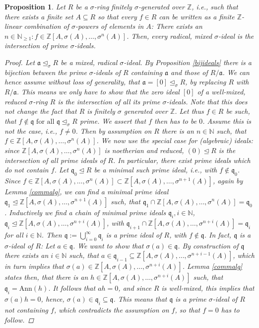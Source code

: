 \documentclass{article}
\def\NE{\mathbb{N}_{\geq1}}
\def\N{\mathbb{N}}
\def\Z{\mathbb{Z}}
\def\a{\mathfrak{a}}
\def\q{\mathfrak{q}}
\def\s{\sigma}
\def\si{\unlhd_{\sigma}}
\def\fa{\text{ for all }}
\newenvironment{bew}{\begin{proof}[Proof]}{\end{proof}}
\theoremstyle{plain}
\newtheorem{prop}[Satz]{Proposition}
\theoremstyle{definition}
\begin{document}
\begin{prop}\label{mixedintersectionprimesfinite}
Let $R$ be a $\s$-ring finitely $\s$-generated over $\Z$, i.e., such that there exists a finite set $A \subseteq R$ so that every $f \in R$ can be written as a finite $\Z$-linear combination of $\s$-powers of elements in $A$: 
There exists an $n \in \NE: f \in \Z[A,\sigma(A),\ldots,\s^n(A)]$. Then, every radical, mixed $\s$-ideal is the intersection of prime $\s$-ideals.
\begin{bew}
Let $\a \si R$ be a mixed, radical $\s$-ideal. By Proposition \ref{bijideals} there is a bijection between the prime $\s$-ideals of $R$ containing $\a$ and those of $R/\a$. We can hence assume without loss of generality, that $\a = [0] \si R$,
 by replacing $R$ with $R/\a$. This means we only have to show that the zero ideal $[0]$ of a well-mixed, reduced $\s$-ring $R$ is the intersection of all its prime $\s$-ideals. Note that this does not change the fact
that $R$ is finitely $\s$ generated over $\Z$. Let thus $f \in R$ be such, 
that $f \notin \q \fa \q \si R$ prime. We assert that $f$ then has to be $0$. Assume this is not the case, i.e., $f \neq 0$. Then by assumption on $R$ there is an $n \in \N$ such, that $f \in \Z[A,\s(A),\ldots,\s^n(A)]$.
We now use the special case for (algebraic) ideals: since $\Z[A,\s(A),\ldots,\s^n(A)]$ is noetherian and reduced, $(0) \unlhd R$ is the intersection of all prime ideals of $R$. In particular, there exist prime ideals which do not contain $f$.
Let $\q_0 \unlhd R$ be a minimal such prime ideal, i.e., with $f \notin \q_0$. Since $f \in \Z[A,\s(A),\ldots,\s^n(A)] \subset \Z[A,\s(A),\ldots,\s^{n+1}(A)]$, again by Lemma \ref{commalg}, we can find a minimal prime ideal $\q_1 \unlhd \Z[A,\s(A),\ldots,\s^{n+1}(A)]$
such, that $\q_1 \cap \Z[A,\s(A),\ldots,\s^{n}(A)] = \q_0$. Inductively we find a chain of minimal prime ideals $\q_i, i \in \N$, $\q_i \unlhd \Z[A,\s(A),\ldots,\s^{n+i}(A)]$, with $\q_{i+1} \cap \Z[A,\s(A),\ldots,\s^{n+i}(A)] = \q_i$ for all $i \in \N$.
Then $\q := \bigcup_{i=0}^{\infty} \q_i$ is a prime ideal of $R$, with $f \notin \q$. In fact, $\q$ is a $\s$-ideal of $R$: Let $a \in \q$. We want to show that $\s(a) \in \q$. By construction of $\q$ there exists an $i \in \N$ such,
that $a \in \q_{i-1} \subseteq \Z[A,\s(A),\ldots,\s^{n+i-1}(A)]$, which in turn implies that $\s(a) \in \Z[A,\s(A),\ldots,\s^{n+i}(A)]$. Lemma \ref{commalg} states then, that there is an $h \in \Z[A,\s(A),\ldots,\s^{n+i}(A)]$ such, that $ \q_i = \text{Ann}(h)$.
It follows that $ah = 0$, and since $R$ is well-mixed, this implies that $\s(a)h = 0$, hence, $\s(a) \in \q_i \subseteq \q$. This means that $\q$ is a prime $\s$-ideal of $R$ not containing $f$, which contradicts the assumption on $f$, so that $f = 0$ has to follow.
\end{bew}
\end{prop}
\end{document}
